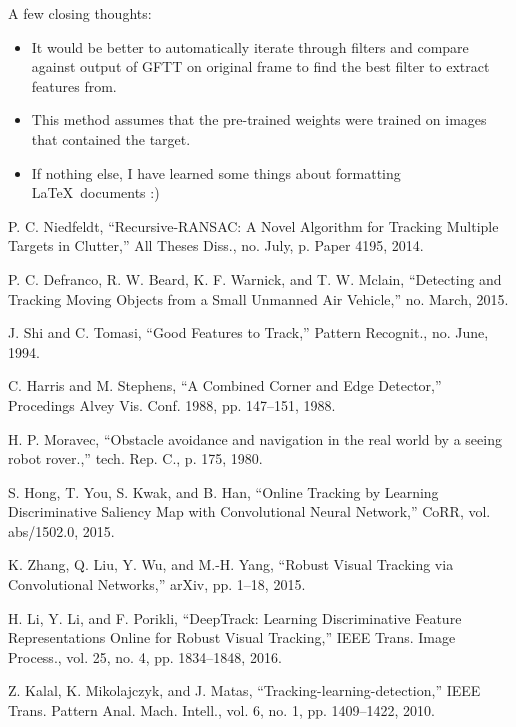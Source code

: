 \documentclass[hidelinks]{article}
\begin{document}
A few closing thoughts:
\begin{itemize}
  
  \item It would be better to automatically iterate through filters and compare against output of GFTT on original frame to find the best filter to extract features from.
  
  \item This method assumes that the pre-trained weights were trained on images that contained the target.

  \item If nothing else, I have learned some things about formatting \LaTeX\ documents :)
  
\end{itemize}

\begin{thebibliography}{99}
\small

 P. C. Niedfeldt, “Recursive-RANSAC: A Novel Algorithm for Tracking Multiple Targets in Clutter,” All Theses Diss., no. July, p. Paper 4195, 2014.

 P. C. Defranco, R. W. Beard, K. F. Warnick, and T. W. Mclain, “Detecting and Tracking Moving Objects from a Small Unmanned Air Vehicle,” no. March, 2015.

 J. Shi and C. Tomasi, “Good Features to Track,” Pattern Recognit., no. June, 1994.

 C. Harris and M. Stephens, “A Combined Corner and Edge Detector,” Procedings Alvey Vis. Conf. 1988, pp. 147–151, 1988.

 H. P. Moravec, “Obstacle avoidance and navigation in the real world by a seeing robot rover.,” tech. Rep. C., p. 175, 1980.

 S. Hong, T. You, S. Kwak, and B. Han, “Online Tracking by Learning Discriminative Saliency Map with Convolutional Neural Network,” CoRR, vol. abs/1502.0, 2015.

 K. Zhang, Q. Liu, Y. Wu, and M.-H. Yang, “Robust Visual Tracking via Convolutional Networks,” arXiv, pp. 1–18, 2015.

 H. Li, Y. Li, and F. Porikli, “DeepTrack: Learning Discriminative Feature Representations Online for Robust Visual Tracking,” IEEE Trans. Image Process., vol. 25, no. 4, pp. 1834–1848, 2016.

 Z. Kalal, K. Mikolajczyk, and J. Matas, “Tracking-learning-detection,” IEEE Trans. Pattern Anal. Mach. Intell., vol. 6, no. 1, pp. 1409–1422, 2010.


\end{thebibliography}
\end{document}
